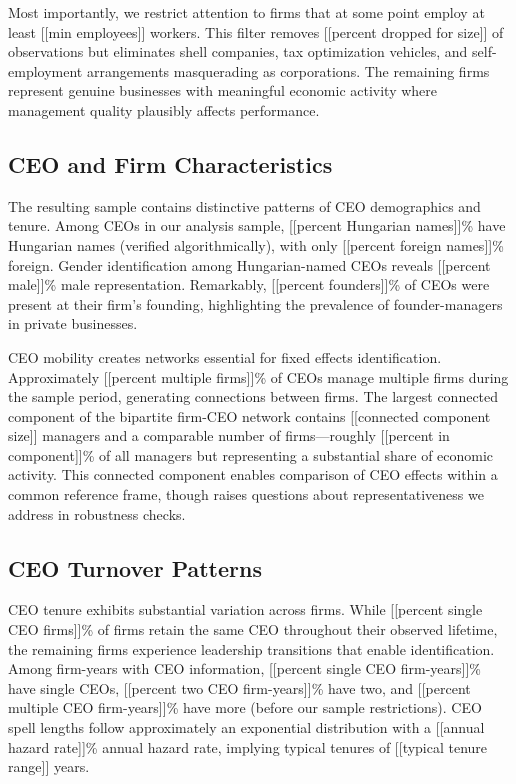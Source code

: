 \documentclass[11pt,a4paper]{article}
\begin{document}
Most importantly, we restrict attention to firms that at some point employ at least [[min employees]] workers. This filter removes [[percent dropped for size]] of observations but eliminates shell companies, tax optimization vehicles, and self-employment arrangements masquerading as corporations. The remaining firms represent genuine businesses with meaningful economic activity where management quality plausibly affects performance.

\subsection{CEO and Firm Characteristics}

The resulting sample contains distinctive patterns of CEO demographics and tenure. Among CEOs in our analysis sample, [[percent Hungarian names]]\% have Hungarian names (verified algorithmically), with only [[percent foreign names]]\% foreign. Gender identification among Hungarian-named CEOs reveals [[percent male]]\% male representation. Remarkably, [[percent founders]]\% of CEOs were present at their firm's founding, highlighting the prevalence of founder-managers in private businesses.

CEO mobility creates networks essential for fixed effects identification. Approximately [[percent multiple firms]]\% of CEOs manage multiple firms during the sample period, generating connections between firms. The largest connected component of the bipartite firm-CEO network contains [[connected component size]] managers and a comparable number of firms—roughly [[percent in component]]\% of all managers but representing a substantial share of economic activity. This connected component enables comparison of CEO effects within a common reference frame, though raises questions about representativeness we address in robustness checks.

\subsection{CEO Turnover Patterns}

CEO tenure exhibits substantial variation across firms. While [[percent single CEO firms]]\% of firms retain the same CEO throughout their observed lifetime, the remaining firms experience leadership transitions that enable identification. Among firm-years with CEO information, [[percent single CEO firm-years]]\% have single CEOs, [[percent two CEO firm-years]]\% have two, and [[percent multiple CEO firm-years]]\% have more (before our sample restrictions). CEO spell lengths follow approximately an exponential distribution with a [[annual hazard rate]]\% annual hazard rate, implying typical tenures of [[typical tenure range]] years.
\end{document}
